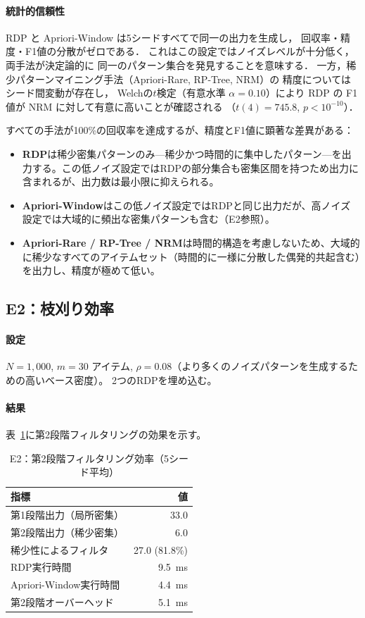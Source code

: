 \paragraph{統計的信頼性}
RDP と Apriori-Window は5シードすべてで同一の出力を生成し，
回収率・精度・F1値の分散がゼロである．
これはこの設定ではノイズレベルが十分低く，両手法が決定論的に
同一のパターン集合を発見することを意味する．
一方，稀少パターンマイニング手法（Apriori-Rare, RP-Tree, NRM）の
精度についてはシード間変動が存在し，
Welchの$t$検定（有意水準 $\alpha = 0.10$）により RDP の F1 値が NRM に対して有意に高いことが確認される
（$t(4) = 745.8$, $p < 10^{-10}$）．

すべての手法が100\%の回収率を達成するが、精度とF1値に顕著な差異がある：
\begin{itemize}
\item \textbf{RDP}は稀少密集パターンのみ---稀少かつ時間的に集中したパターン---を出力する。この低ノイズ設定ではRDPの部分集合も密集区間を持つため出力に含まれるが、出力数は最小限に抑えられる。
\item \textbf{Apriori-Window}はこの低ノイズ設定ではRDPと同じ出力だが、高ノイズ設定では大域的に頻出な密集パターンも含む（E2参照）。
\item \textbf{Apriori-Rare / RP-Tree / NRM}は時間的構造を考慮しないため、大域的に稀少なすべてのアイテムセット（時間的に一様に分散した偶発的共起含む）を出力し、精度が極めて低い。
\end{itemize}

\subsection{E2：枝刈り効率}

\paragraph{設定}
$N = 1{,}000$, $m = 30$ アイテム, $\rho = 0.08$（より多くのノイズパターンを生成するための高いベース密度）。
2つのRDPを埋め込む。

\paragraph{結果}
表~\ref{tab:e2}に第2段階フィルタリングの効果を示す。

\begin{table}[t]
\centering
\caption{E2：第2段階フィルタリング効率（5シード平均）}
\label{tab:e2}
\begin{tabular}{lr}
\toprule
\textbf{指標} & \textbf{値} \\
\midrule
第1段階出力（局所密集） & 33.0 \\
第2段階出力（稀少密集）    & 6.0 \\
稀少性によるフィルタ             & 27.0 (81.8\%) \\
\midrule
RDP実行時間                    & 9.5~ms \\
Apriori-Window実行時間         & 4.4~ms \\
第2段階オーバーヘッド               & 5.1~ms \\
\bottomrule
\end{tabular}
\end{table}

